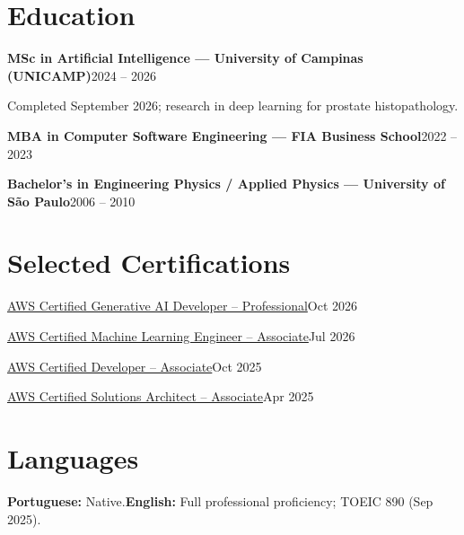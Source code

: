\section{Education}
\textbf{MSc in Artificial Intelligence --- University of Campinas (UNICAMP)}\hfill {\small 2024 -- 2026}\par
Completed September 2026; research in deep learning for prostate histopathology.\par
\textbf{MBA in Computer Software Engineering --- FIA Business School}\hfill {\small 2022 -- 2023}\par
\textbf{Bachelor's in Engineering Physics / Applied Physics --- University of S\~ao Paulo}\hfill {\small 2006 -- 2010}\par

\section{Selected Certifications}
\href{https://www.credly.com/badges/da6596b6-50b9-436a-b5b5-8d59cb9c4b57/linked_in_profile}{AWS Certified Generative AI Developer -- Professional}\hfill {\small Oct 2026}\par
\href{https://www.credly.com/badges/c6c30196-7851-4b13-86dc-8dc39bcc88af/linked_in_profile}{AWS Certified Machine Learning Engineer -- Associate}\hfill {\small Jul 2026}\par
\href{https://www.credly.com/badges/b6f2cb3b-6864-458f-b23b-9c7338162201/linked_in_profile}{AWS Certified Developer -- Associate}\hfill {\small Oct 2025}\par
\href{https://www.credly.com/badges/49d75390-52d0-4dc5-a5bb-a3f803ab0c86/linked_in_profile}{AWS Certified Solutions Architect -- Associate}\hfill {\small Apr 2025}\par

\section{Languages}
\textbf{Portuguese:} Native.\quad\textbf{English:} Full professional proficiency; TOEIC 890 (Sep 2025).\par

